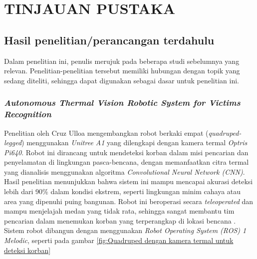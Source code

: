 \chapter{TINJAUAN PUSTAKA}
\label{chap:tinjauanpustaka}


\section{Hasil penelitian/perancangan terdahulu}
Dalam penelitian ini, penulis merujuk pada beberapa studi sebelumnya yang relevan. Penelitian-penelitian tersebut memiliki hubungan dengan topik yang sedang diteliti, sehingga dapat digunakan sebagai dasar untuk penelitian ini.

\subsection{\emph{Autonomous Thermal Vision Robotic System for Victims Recognition}}

Penelitian oleh Cruz Ulloa mengembangkan robot berkaki empat (\emph{quadruped-legged}) menggunakan \emph{Unitree A1} yang dilengkapi dengan kamera termal \emph{Optris Pi640}. Robot ini dirancang untuk mendeteksi korban dalam misi pencarian dan penyelamatan di lingkungan pasca-bencana, dengan memanfaatkan citra termal yang dianalisis menggunakan algoritma \emph{Convolutional Neural Network (CNN)}. Hasil penelitian menunjukkan bahwa sistem ini mampu mencapai akurasi deteksi lebih dari 90\% dalam kondisi ekstrem, seperti lingkungan minim cahaya atau area yang dipenuhi puing bangunan. Robot ini beroperasi secara \emph{teleoperated} dan mampu menjelajah medan yang tidak rata, sehingga sangat membantu tim pencarian dalam menemukan korban yang terperangkap di lokasi bencana \cite{Cruz2021}. Sistem robot dibangun dengan menggunakan \emph{Robot Operating System (ROS) 1 Melodic}, seperti pada gambar \ref{fig:Quadruped dengan kamera termal untuk deteksi korban}

